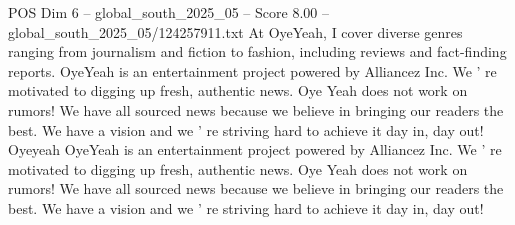\begin{textsample}{POS Dim 6 – global\_south\_2025\_05 – Score 8.00 – global\_south\_2025\_05/124257911.txt}
At OyeYeah, I cover diverse genres ranging from journalism and fiction to fashion, including reviews and fact-finding reports.
OyeYeah is an entertainment project powered by Alliancez Inc.
We ' re motivated to digging up fresh, authentic news.
Oye Yeah does not work on rumors!
We have all sourced news because we believe in bringing our readers the best.
We have a vision and we ' re striving hard to achieve it day in, day out!
Oyeyeah OyeYeah is an entertainment project powered by Alliancez Inc.
We ' re motivated to digging up fresh, authentic news.
Oye Yeah does not work on rumors!
We have all sourced news because we believe in bringing our readers the best.
We have a vision and we ' re striving hard to achieve it day in, day out!

\end{textsample}
